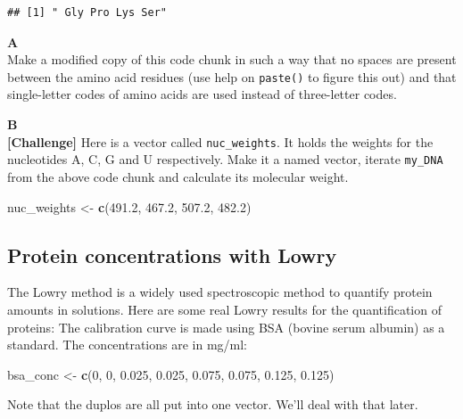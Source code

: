 \documentclass[]{book}
\newenvironment{Shaded}{\begin{snugshade}}{\end{snugshade}}
\newcommand{\DecValTok}[1]{\textcolor[rgb]{0.00,0.00,0.81}{#1}}
\newcommand{\FloatTok}[1]{\textcolor[rgb]{0.00,0.00,0.81}{#1}}
\newcommand{\KeywordTok}[1]{\textcolor[rgb]{0.13,0.29,0.53}{\textbf{#1}}}
\newcommand{\NormalTok}[1]{#1}
\newcommand{\StringTok}[1]{\textcolor[rgb]{0.31,0.60,0.02}{#1}}
\begin{document}
\begin{verbatim}
## [1] " Gly Pro Lys Ser"
\end{verbatim}

\textbf{A}\\
Make a modified copy of this code chunk in such a way that no spaces are present between the amino acid residues (use help on \texttt{paste()} to figure this out) and that single-letter codes of amino acids are used instead of three-letter codes.

\textbf{B}\\
\textbf{{[}Challenge{]}} Here is a vector called \texttt{nuc\_weights}. It holds the weights for the nucleotides A, C, G and U respectively. Make it a named vector, iterate \texttt{my\_DNA} from the above code chunk and calculate its molecular weight.

\begin{Shaded}
\begin{Highlighting}[]
\NormalTok{nuc_weights <-}\StringTok{ }\KeywordTok{c}\NormalTok{(}\FloatTok{491.2}\NormalTok{, }\FloatTok{467.2}\NormalTok{, }\FloatTok{507.2}\NormalTok{, }\FloatTok{482.2}\NormalTok{)}
\end{Highlighting}
\end{Shaded}

\hypertarget{protein-concentrations-with-lowry}{%
\subsection{Protein concentrations with Lowry}\label{protein-concentrations-with-lowry}}

The Lowry method is a widely used spectroscopic method to quantify protein amounts in solutions. Here are some real Lowry results for the quantification of proteins:
The calibration curve is made using BSA (bovine serum albumin) as a standard.
The concentrations are in mg/ml:

\begin{Shaded}
\begin{Highlighting}[]
\NormalTok{bsa_conc <-}\StringTok{ }\KeywordTok{c}\NormalTok{(}\DecValTok{0}\NormalTok{,    }\DecValTok{0}\NormalTok{,  }\FloatTok{0.025}\NormalTok{,  }\FloatTok{0.025}\NormalTok{,  }\FloatTok{0.075}\NormalTok{,  }\FloatTok{0.075}\NormalTok{,  }\FloatTok{0.125}\NormalTok{,  }\FloatTok{0.125}\NormalTok{)}
\end{Highlighting}
\end{Shaded}

Note that the duplos are all put into one vector. We'll deal with that later.
\end{document}
